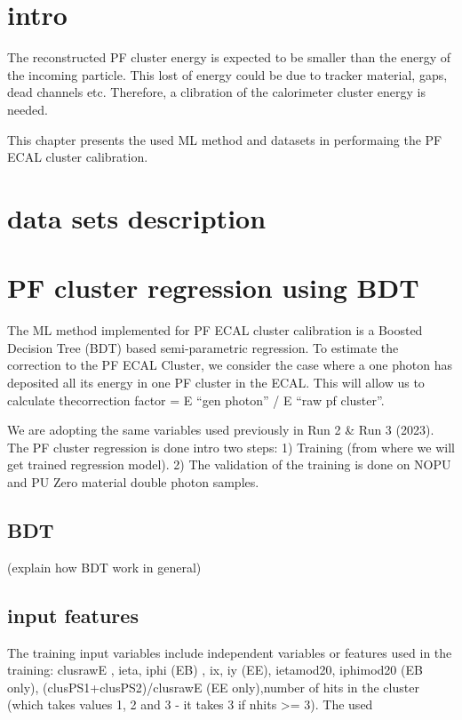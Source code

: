 
\section{intro}


The reconstructed PF cluster energy is expected to be smaller than the energy of the incoming particle. This lost of energy could be due to tracker material, gaps, dead channels etc. Therefore, a clibration of the calorimeter cluster energy is needed. 

This chapter presents the used ML method and datasets in performaing the PF ECAL cluster calibration.  

\section{data sets description}


\section{PF cluster regression using BDT}
The ML method implemented for PF ECAL cluster calibration is a Boosted Decision Tree (BDT) based semi-parametric regression. To estimate the correction to  the PF ECAL Cluster, we consider the case where a one photon has deposited all its energy in one PF cluster in the ECAL. This will allow us to calculate thecorrection factor = E “gen photon” / E “raw pf cluster”.

We are adopting the same variables used previously in Run 2 & Run 3 (2023). The PF cluster regression is done intro two steps:
1) Training (from where we will get trained regression model).
2) The validation of the training is done on NOPU and PU Zero material double photon samples.

\subsection{BDT}
(explain how BDT work in general)

\subsection{input features}
The training input variables include independent variables or features used in the training:
clusrawE , ieta, iphi (EB) , ix, iy (EE), ietamod20, iphimod20 (EB only), (clusPS1+clusPS2)/clusrawE (EE only),number of hits in the cluster (which takes values 1, 2 and 3 - it takes 3 if nhits >= 3). The used

